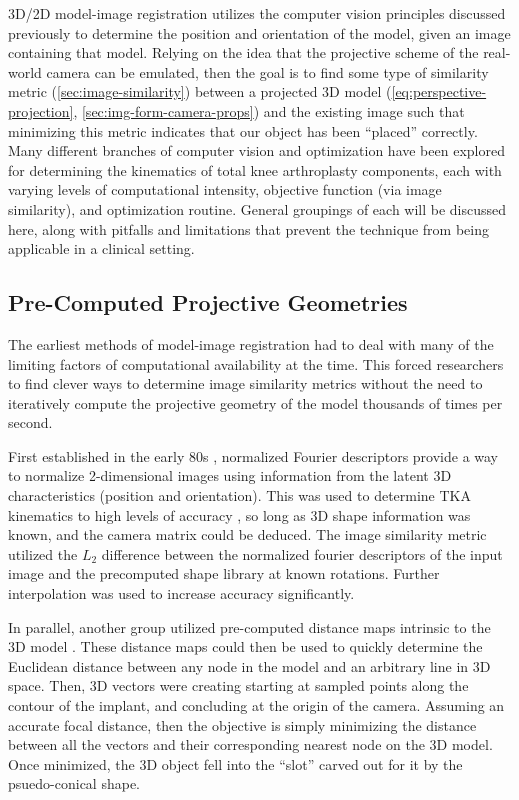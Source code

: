 3D/2D model-image registration utilizes the computer vision principles discussed previously to determine the position and orientation of the model, given an image containing that model. Relying on the idea that the projective scheme of the real-world camera can be emulated, then the goal is to find some type of similarity metric (\cref{sec:image-similarity}) between a projected 3D model (\cref{eq:perspective-projection}, \cref{sec:img-form-camera-props}) and the existing image such that minimizing this metric indicates that our object has been ``placed'' correctly. Many different branches of computer vision and optimization have been explored for determining the kinematics of total knee arthroplasty components, each with varying levels of computational intensity, objective function (via image similarity), and optimization routine. General groupings of each will be discussed here, along with pitfalls and limitations that prevent the technique from being applicable in a clinical setting.

\subsection{Pre-Computed Projective Geometries}
The earliest methods of model-image registration had to deal with many of the limiting factors of computational availability at the time. This forced researchers to find clever ways to determine image similarity metrics without the need to iteratively compute the projective geometry of the model thousands of times per second.

First established in the early 80s \cite{wallaceAnalysisThreedimensionalMovement1980,wallaceEfficientThreedimensionalAircraft1980}, normalized Fourier descriptors provide a way to normalize 2-dimensional images using information from the latent 3D characteristics (position and orientation). This was used to determine TKA kinematics to high levels of accuracy \cite{banksModelBased3D1992,banksAccurateMeasurementThreedimensional1996}, so long as 3D shape information was known, and the camera matrix could be deduced. The image similarity metric utilized the $L_2$ difference between the normalized fourier descriptors of the input image and the precomputed shape library at known rotations. Further interpolation was used to increase accuracy significantly.

In parallel, another group utilized pre-computed distance maps intrinsic to the 3D model \cite{lavalleeRecoveringPositionOrientation1995,zuffiModelbasedMethodReconstruction1999}. These distance maps could then be used to quickly determine the Euclidean distance between any node in the model and an arbitrary line in 3D space. Then, 3D vectors were creating starting at sampled points along the contour of the implant, and concluding at the origin of the camera. Assuming an accurate focal distance, then the objective is simply minimizing the distance between all the vectors and their corresponding nearest node on the 3D model. Once minimized, the 3D object fell into the ``slot'' carved out for it by the psuedo-conical shape.


